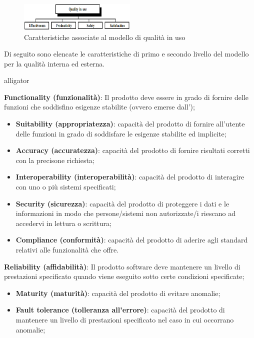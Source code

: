 \begin{figure}[h!]
	\centering
	\includegraphics[width=0.50\textwidth]{img/in_use.png}
	\caption{Caratteristiche associate al modello di qualità in uso}
	\label{fig:in_use}
\end{figure}

Di seguito sono elencate le caratteristiche di primo e secondo livello del modello per la qualità interna ed esterna.
\begin{labeling}{alligator}
	\item \textbf{Functionality (funzionalità)}: Il prodotto deve essere in grado di fornire delle funzioni che soddisfino esigenze stabilite (ovvero emerse dall'\AdR{});
	\begin{itemize}
		\item \textbf{Suitability (appropriatezza)}: capacità del prodotto di fornire all'utente delle funzioni in grado di soddisfare le esigenze stabilite ed implicite;
		
		\item \textbf{Accuracy (accuratezza)}: capacità del prodotto di fornire risultati corretti con la precisone richiesta;
		
		\item \textbf{Interoperability (interoperabilità)}: capacità del prodotto di interagire con uno o più sistemi specificati;
		
		\item \textbf{Security (sicurezza)}: capacità del prodotto di proteggere i dati e le informazioni in modo che persone/sistemi non autorizzate/i riescano ad accedervi in lettura o scrittura;
		
		\item \textbf{Compliance (conformità)}: capacità del prodotto di aderire agli standard relativi alle funzionalità che offre.
	\end{itemize}
	\item \textbf{Reliability (affidabilità)}: Il prodotto software deve mantenere un livello di prestazioni specificato quando viene eseguito sotto certe condizioni specificate;
	\begin{itemize}
		\item \textbf{Maturity (maturità)}: capacità del prodotto di evitare anomalie;
		
		\item \textbf{Fault tolerance (tolleranza all'errore)}: capacità del prodotto di mantenere un livello di prestazioni specificato nel caso in cui occorrano anomalie;
		

\end{itemize}
\end{labeling}
